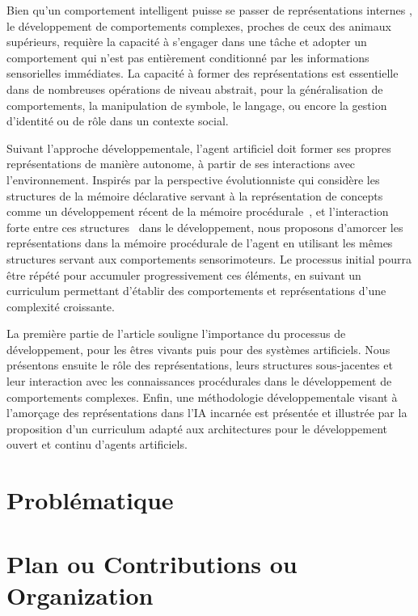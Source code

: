 Bien qu'un comportement intelligent puisse se passer de représentations internes \cite{brooks1986}, le développement de comportements complexes, proches de ceux des animaux supérieurs, requière la capacité à s'engager dans une tâche et adopter un comportement qui n'est pas entièrement conditionné par les informations sensorielles immédiates. La capacité à former des représentations est essentielle dans de nombreuses opérations de niveau abstrait, pour la généralisation de comportements, la manipulation de symbole, le langage, ou encore la gestion d'identité ou de rôle dans un contexte social. 

Suivant l'approche développementale, l'agent artificiel doit former ses propres représentations de manière autonome, à partir de ses interactions avec l'environnement.
Inspirés par la perspective évolutionniste qui considère les structures de la mémoire déclarative servant à la représentation de concepts comme un développement récent de la mémoire procédurale~\cite{ten1999procedural}, et l'interaction forte entre ces structures~\cite{quamprocedural} dans le développement, nous proposons d'amorcer les représentations dans la mémoire procédurale de l'agent en utilisant les mêmes structures servant aux comportements sensorimoteurs.
Le processus initial pourra être répété pour accumuler progressivement ces éléments, en suivant un curriculum permettant d'établir des comportements et représentations d'une complexité croissante.

La première partie de l'article souligne l'importance du processus de développement, pour les êtres vivants puis pour des systèmes artificiels. Nous présentons ensuite le rôle des représentations, leurs structures sous-jacentes et leur interaction avec les connaissances procédurales dans le développement de comportements complexes.
Enfin, une méthodologie développementale visant à l'amorçage des représentations dans l'IA incarnée est présentée et illustrée par la proposition d'un curriculum adapté aux architectures pour le développement ouvert et continu d'agents artificiels.


\section{Problématique}



\section{Plan ou Contributions ou Organization}
